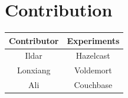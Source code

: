 \documentclass[a4paper]{article}
\begin{document}
\section*{Contribution}

\begin{table}[h]
	\centering
	\begin{tabular}{|c|c|}
		\hline
		\rowcolor{light-gray} \textbf{Contributor} & \textbf{Experiments} \\ \hline
		Ildar & Hazelcast  \\ \hline
		Lonxiang & Voldemort  \\ \hline
		Ali & Couchbase  \\ \hline
	\end{tabular}
\end{table}

\printbibliography
\end{document}
